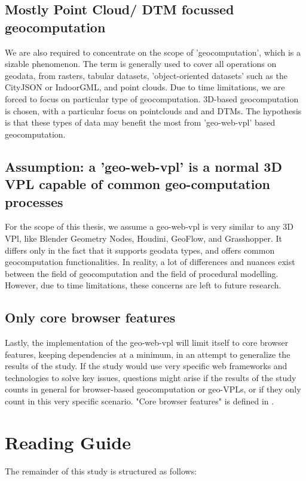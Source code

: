 \subsection*{Mostly Point Cloud/ DTM focussed geocomputation}
We are also required to concentrate on the scope of 'geocomputation', which is a sizable phenomenon.
The term is generally used to cover all operations on geodata, from rasters, tabular datasets, 'object-oriented datasets' such as the CityJSON or IndoorGML, and point clouds. 
Due to time limitations, we are forced to focus on particular type of geocomputation.
3D-based geocomputation is chosen, with a particular focus on pointclouds and and DTMs. 
The hypothesis is that these types of data may benefit the most from 'geo-web-vpl' based geocomputation.

\subsection*{Assumption: a '\ac{geo-web-vpl}' is a normal 3D VPL capable of common geo-computation processes}
For the scope of this thesis, we assume a \ac{geo-web-vpl} is very similar to any 3D VPl, like Blender Geometry Nodes, Houdini, GeoFlow, and Grasshopper. 
It differs only in the fact that it supports geodata types, and offers common geocomputation functionalities. 
In reality, a lot of differences and nuances exist between the field of geocomputation and the field of procedural modelling. 
However, due to time limitations, these concerns are left to future research.
 
\subsection*{Only core browser features}
Lastly, the implementation of the geo-web-vpl will limit itself to core browser features, keeping dependencies at a minimum, in an attempt to generalize the results of the study.
If the study would use very specific web frameworks and technologies to solve key issues, questions might arise if the results of the study counts in general for browser-based geocomputation or geo-VPLs, or if they only count in this very specific scenario. 
"Core browser features" is defined in .

\newpage
\section{Reading Guide}
The remainder of this study is structured as follows:

